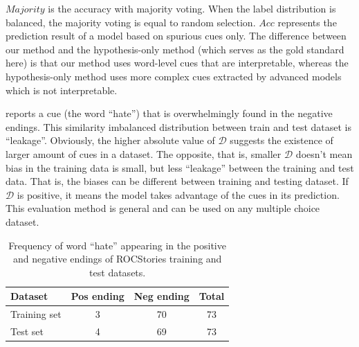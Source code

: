 ${Majority}$ is the accuracy with majority voting. When the label distribution is balanced, the majority 
voting is equal to random selection. ${Acc}$ represents the prediction result of 
a model based on spurious cues only. 
The difference between our method and the hypothesis-only method (which serves as
the gold standard here) is that our method uses word-level cues that are interpretable,
whereas the hypothesis-only method uses more complex cues extracted by advanced models
which is not interpretable.

 reports a cue
(the word ``hate'') that is overwhelmingly found in the negative
endings. This similarity imbalanced distribution between train and test dataset is ``leakage''.
Obviously, the higher absolute value of $\mathcal{D}$ suggests 
the existence of larger amount of cues in a dataset. The opposite, that is, 
smaller $\mathcal{D}$ doesn't mean bias in the training data is small, 
but less ``leakage'' between the training and test data. 
That is, the biases can be different between training and testing dataset.
If $\mathcal{D}$ is positive, it means the 
model takes advantage of the cues in its prediction.
This evaluation method is general and can be used on any multiple choice dataset. 

\begin{table}[th]
\small
\centering
\begin{tabular}{lccc}
\hline
\textbf{Dataset}& Pos ending& Neg ending &Total\\
\hline
Training set & 3  & 70 &73\\
Test set          & 4  & 69 &73\\
\hline
\end{tabular}
\caption{Frequency of word ``hate'' appearing in the positive and 
negative endings of ROCStories training and test datasets.}
\label{tab:hate}
\end{table}

